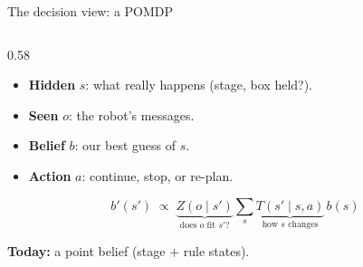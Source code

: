 \documentclass[14pt, aspectratio=169]{beamer}
\newcommand{\key}[1]{\textbf{\color{acc}#1}}
\begin{document}
\begin{frame}{The decision view: a POMDP}
    \begin{columns}[c]
        \begin{column}{0.58\textwidth}
            \small
            \begin{itemize}
                \item \textbf{Hidden} $s$: what really happens (stage, box held?).
                \item \textbf{Seen} $o$: the robot's messages.
                \item \textbf{Belief} $b$: our best guess of $s$.
                \item \textbf{Action} $a$: continue, stop, or re-plan.
            \end{itemize}
            \vspace{-0.1cm}
            \[
                b'(s') \;\propto\; \underbrace{Z(o \mid s')}_{\text{does $o$ fit $s'$?}} \sum_{s} \underbrace{T(s' \mid s, a)}_{\text{how $s$ changes}}\, b(s)
            \]
            \vspace{-0.2cm}

            \key{Today:} a point belief (stage + rule states).


\end{column}
\end{columns}
\end{frame}
\end{document}
